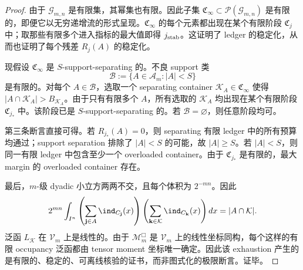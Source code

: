 \begin{proof}
由于 \(\mathcal G_{m,n}\) 是有限集，其幂集也有限。因此子集 \(\mathfrak C_\infty\subset\mathcal P(\mathcal G_{m,n})\) 是有限的，即便它以无穷递增流的形式呈现。\(\mathfrak C_\infty\) 的每个元素都出现在某个有限阶段 \(\mathfrak C_j\) 中；取那些有限多个进入指标的最大值即得 \(j_{\rm stab}\)。这证明了 ledger 的稳定化，从而也证明了每个残差 \(R_j(A)\) 的稳定化。

现假设 \(\mathfrak C_\infty\) 是 \(S\)-support-separating 的。不良 support 类
\[
\mathscr B:=\{A\in\mathscr A_m: |A|<S\}
\]
是有限的。对每个 \(A\in\mathscr B\)，选取一个 separating container \(\mathcal K_A\in\mathfrak C_\infty\) 使得 \(|A\cap\mathcal K_A|>B_{\mathcal K_A}\)。由于只有有限多个 \(A\)，所有选取的 \(\mathcal K_A\) 均出现在某个有限阶段 \(\mathfrak C_{j_\ast}\) 中。该阶段已是 \(S\)-support-separating 的。若 \(\mathscr B=\varnothing\)，则任意阶段均可。

第三条断言直接可得。若 \(R_{j_\ast}(A)=0\)，则 separating 有限 ledger 中的所有预算均通过；support separation 排除了 \(|A|<S\) 的可能，故 \(|A|\ge S\)。若 \(|A|<S\)，则同一有限 ledger 中包含至少一个 overloaded container。由于 \(\mathfrak C_{j_\ast}\) 是有限的，最大 margin 的 overloaded container 存在。

最后，\(m\)-级 dyadic 小立方两两不交，且每个体积为 \(2^{-mn}\)。因此
\[
2^{mn}\int_{I^n}\left(\sum_{\mathbf j\in A}\ind_{C_{\mathbf j}}(x)\right)
\left(\sum_{\mathbf k\in\mathcal K}\ind_{C_{\mathbf k}}(x)\right)dx
=|A\cap\mathcal K|.
\]
泛函 \(L_{\mathcal K}\) 在 \(\mathcal V_m\) 上是线性的。由于 \(\mathcal M_m^{\Box}\) 是 \(\mathcal V_m\) 上的线性坐标同构，每个这样的有限 occupancy 泛函都由 tensor moment 坐标唯一确定。因此该 exhaustion 产生的是有限的、稳定的、可离线核验的证书，而非图式化的极限断言。证毕。
\end{proof}

\endinput
